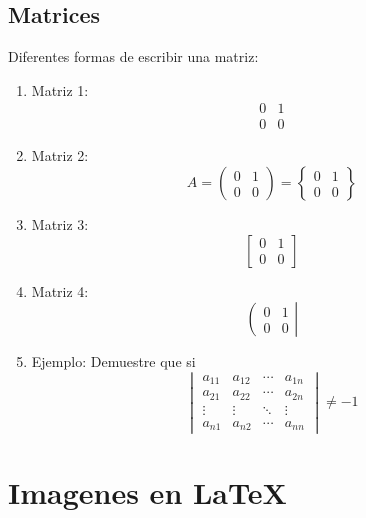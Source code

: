 \section{Matrices}
Diferentes formas de escribir una matriz:
\begin{enumerate}
\item Matriz 1:
\begin{displaymath}
\begin{matrix}
0 & 1\\
0 & 0
\end{matrix}
\end{displaymath}
\item Matriz 2:
\begin{displaymath}
A=
\begin{pmatrix}
0 & 1\\
0 & 0
\end{pmatrix}
=
\begin{Bmatrix}
0 & 1\\
0 & 0
\end{Bmatrix}
\end{displaymath}
\item Matriz 3:
\begin{displaymath}
\begin{bmatrix}
0 & 1\\
0 & 0
\end{bmatrix}
\end{displaymath}
\item Matriz 4:
\begin{displaymath}
\left (
\begin{matrix}
0 & 1\\
0 & 0
\end{matrix}
\right |
\end{displaymath}
\item Ejemplo:	 Demuestre que si
\begin{displaymath}
\begin{vmatrix}
a_{11} & a_{12} & \cdots & a_{1n}\\
a_{21} & a_{22} & \cdots & a_{2n}\\
\vdots & \vdots & \ddots &\vdots \\
a_{n1} & a_{n2} & \cdots & a_{nn}
\end{vmatrix}\neq -1
\end{displaymath}
\end{enumerate}
\newpage
\chapter{Imagenes en \LaTeX}
